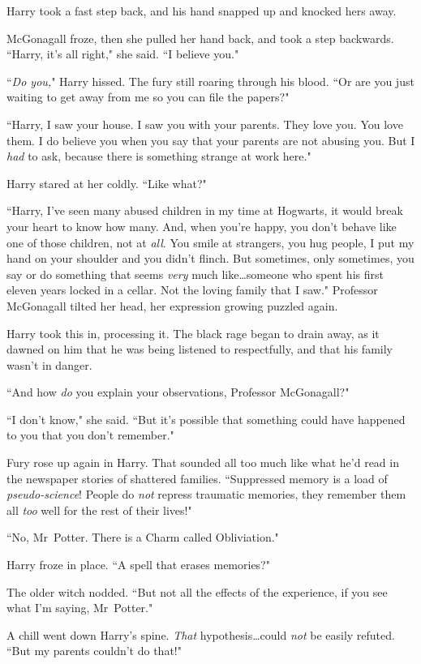 Harry took a fast step back, and his hand snapped up and knocked hers away.

McGonagall froze, then she pulled her hand back, and took a step backwards. ``Harry, it's all right," she said. ``I believe you."

``\emph{Do you,}" Harry hissed. The fury still roaring through his blood. ``Or are you just waiting to get away from me so you can file the papers?"

``Harry, I saw your house. I saw you with your parents. They love you. You love them. I do believe you when you say that your parents are not abusing you. But I \emph{had} to ask, because there is something strange at work here."

Harry stared at her coldly. ``Like what?"

``Harry, I've seen many abused children in my time at Hogwarts, it would break your heart to know how many. And, when you're happy, you don't behave like one of those children, not at \emph{all}. You smile at strangers, you hug people, I put my hand on your shoulder and you didn't flinch. But sometimes, only sometimes, you say or do something that seems \emph{very} much like…someone who spent his first eleven years locked in a cellar. Not the loving family that I saw." Professor McGonagall tilted her head, her expression growing puzzled again.

Harry took this in, processing it. The black rage began to drain away, as it dawned on him that he was being listened to respectfully, and that his family wasn't in danger.

``And how \emph{do} you explain your observations, Professor McGonagall?"

``I don't know," she said. ``But it's possible that something could have happened to you that you don't remember."

Fury rose up again in Harry. That sounded all too much like what he'd read in the newspaper stories of shattered families. ``Suppressed memory is a load of \emph{pseudo-science}! People do \emph{not} repress traumatic memories, they remember them all \emph{too} well for the rest of their lives!"

``No, Mr~Potter. There is a Charm called Obliviation."

Harry froze in place. ``A spell that erases memories?"

The older witch nodded. ``But not all the effects of the experience, if you see what I'm saying, Mr~Potter."

A chill went down Harry's spine. \emph{That} hypothesis…could \emph{not} be easily refuted. ``But my parents couldn't do that!"

